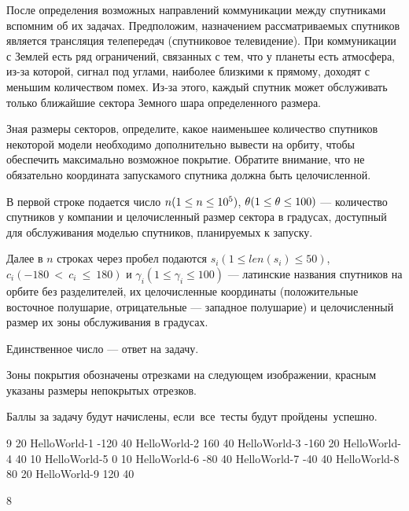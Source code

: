 
После определения возможных направлений коммуникации между спутниками вспомним об их задачах. Предположим, назначением рассматриваемых спутников является трансляция телепередач (спутниковое телевидение). При коммуникации с Землей есть ряд ограничений, связанных с тем, что у планеты есть атмосфера, из-за которой, сигнал под углами, наиболее близкими к прямому, доходят с меньшим количеством помех. Из-за этого, каждый спутник может обслуживать только ближайшие сектора Земного шара определенного размера. 


Зная размеры секторов, определите, какое наименьшее количество спутников некоторой модели необходимо дополнительно вывести на орбиту, чтобы обеспечить максимально возможное покрытие. Обратите внимание, что не обязательно координата запускамого спутника должна быть целочисленной. 


В первой строке подается число $ n\space(1 \leq n \leq 10^5) $, $ \theta\space (1 \leq \theta \leq 100) $ — количество спутников у компании и целочисленный размер сектора в градусах, доступный для обслуживания моделью спутников, планируемых к запуску.

Далее в $n$ строках через пробел подаются $ s_i(1\leq len(s_i)\leq 50)$, $ c_i(-180~<~c_i~\leq~180) $ и $ \gamma_i (1 \leq \gamma_i \leq 100)$  — латинские названия спутников на орбите без разделителей, их целочисленные координаты (положительные  восточное полушарие, отрицательные — западное полушарие) и целочисленный размер их зоны обслуживания в градусах.

\outputfmtSection

Единственное число — ответ на задачу.

\explanationSection

Зоны покрытия обозначены отрезками на следующем изображении, красным указаны размеры непокрытых отрезков.


\markSection

Баллы за задачу будут начислены, если все тесты будут пройдены успешно.


\begin{myverbbox}[\small]{\vinput}
    9 20
    HelloWorld-1 -120 40
    HelloWorld-2 160 40
    HelloWorld-3 -160 20
    HelloWorld-4 40 10
    HelloWorld-5 0 10
    HelloWorld-6 -80 40
    HelloWorld-7 -40 40
    HelloWorld-8 80 20
    HelloWorld-9 120 40
\end{myverbbox}
\begin{myverbbox}[\small]{\voutput}
    8
\end{myverbbox}



